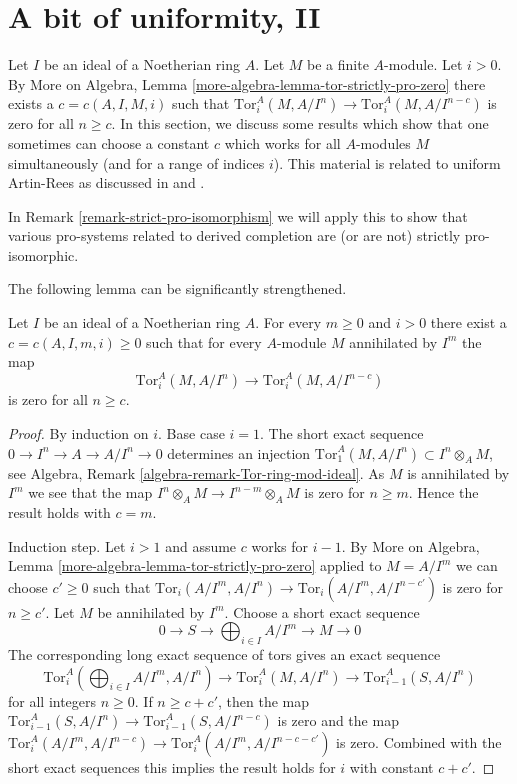 \section{A bit of uniformity, II}
\label{section-uniform-vanishing-bis}

\noindent
Let $I$ be an ideal of a Noetherian ring $A$. Let $M$ be a finite
$A$-module. Let $i > 0$. By More on Algebra, Lemma
\ref{more-algebra-lemma-tor-strictly-pro-zero}
there exists a $c = c(A, I, M, i)$ such that
$\text{Tor}^A_i(M, A/I^n) \to \text{Tor}^A_i(M, A/I^{n - c})$
is zero for all $n \geq c$. In this section, we discuss
some results which show that one sometimes can choose
a constant $c$ which works for all $A$-modules $M$ simultaneously
(and for a range of indices $i$).
This material is related to uniform Artin-Rees as discussed in
\cite{Huneke-uniform} and \cite{AHS}.

\medskip\noindent
In Remark \ref{remark-strict-pro-isomorphism} we will apply this to show that
various pro-systems related to derived completion are (or are not)
strictly pro-isomorphic.

\medskip\noindent
The following lemma can be significantly strengthened.

\begin{lemma}
\label{lemma-maps-zero-fixed-torsion}
Let $I$ be an ideal of a Noetherian ring $A$. For every $m \geq 0$
and $i > 0$ there exist a $c = c(A, I, m, i) \geq 0$ such that
for every $A$-module $M$ annihilated by $I^m$ the map
$$
\text{Tor}^A_i(M, A/I^n) \to \text{Tor}^A_i(M, A/I^{n - c})
$$
is zero for all $n \geq c$.
\end{lemma}

\begin{proof}
By induction on $i$. Base case $i = 1$. The short exact sequence
$0 \to I^n \to A \to A/I^n \to 0$ determines an injection
$\text{Tor}_1^A(M, A/I^n) \subset I^n \otimes_A M$, see
Algebra, Remark \ref{algebra-remark-Tor-ring-mod-ideal}.
As $M$ is annihilated by $I^m$ we see that the map
$I^n \otimes_A M \to I^{n - m} \otimes_A M$ is
zero for $n \geq m$. Hence the result holds with $c = m$.

\medskip\noindent
Induction step. Let $i > 1$ and assume $c$ works for $i - 1$.
By More on Algebra, Lemma \ref{more-algebra-lemma-tor-strictly-pro-zero}
applied to $M = A/I^m$ we can choose $c' \geq 0$ such that
$\text{Tor}_i(A/I^m, A/I^n) \to \text{Tor}_i(A/I^m, A/I^{n - c'})$
is zero for $n \geq c'$. Let $M$ be annihilated by $I^m$. Choose a short
exact sequence
$$
0 \to S \to \bigoplus\nolimits_{i \in I} A/I^m \to M \to 0
$$
The corresponding long exact sequence of tors gives an exact sequence
$$
\text{Tor}_i^A(\bigoplus\nolimits_{i \in I} A/I^m, A/I^n) \to
\text{Tor}_i^A(M, A/I^n) \to
\text{Tor}_{i - 1}^A(S, A/I^n)
$$
for all integers $n \geq 0$. If $n \geq c + c'$, then the map
$\text{Tor}_{i - 1}^A(S, A/I^n) \to \text{Tor}_{i - 1}^A(S, A/I^{n - c})$
is zero and the map $\text{Tor}_i^A(A/I^m, A/I^{n - c}) \to 
\text{Tor}_i^A(A/I^m, A/I^{n - c - c'})$ is zero. Combined with the
short exact sequences this implies the result holds for $i$ with
constant $c + c'$.
\end{proof}

